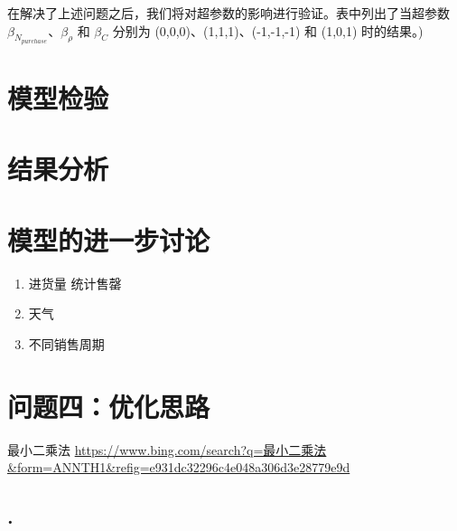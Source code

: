 \documentclass[withoutpreface,bwprint]{cumcmthesis} %
\begin{document}
在解决了上述问题之后，我们将对超参数的影响进行验证。表中列出了当超参数 $\beta_{N_{purchase}}$、$\beta_{\rho}$ 和 $\beta_{C}$ 分别为 (0,0,0)、(1,1,1)、(-1,-1,-1) 和 (1,0,1) 时的结果。)
\section{模型检验}




\section{结果分析}

\section{模型的进一步讨论}
\begin{enumerate}
    \item 进货量  统计售罄
    \item 天气
    \item 不同销售周期
\end{enumerate}
\section{问题四：优化思路}

\begin{thebibliography}{9}%
    最小二乘法
    \newblock \url{https://www.bing.com/search?q=最小二乘法&form=ANNTH1&refig=e931dc32296c4e048a306d3e28779e9d}
\end{thebibliography}

\newpage
\begin{appendices}
\section{.}
\end{appendices}



\end{document}
